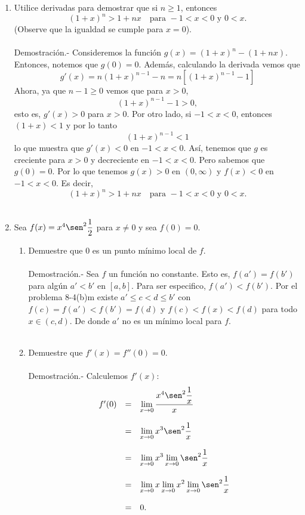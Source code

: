 \begin{enumerate}[\bfseries 1.]
    \item Utilice derivadas para demostrar que si $n\geq 1$, entonces 
    $$(1+x)^n>1+nx\quad \mbox{para }-1<x<0 \mbox{ y } 0<x.$$
    (Observe que la igualdad se cumple para $x=0$).\\\\
	Demostración.-\; Consideremos la función $g(x)=(1+x)^n-(1+nx)$. Entonces, notemos que $g(0)=0$. Además, calculando la derivada vemos que
	$$g'(x)=n(1+x)^{n-1}-n=n\left[(1+x)^{n-1}-1\right]$$
	Ahora, ya que $n-1\geq 0$ vemos que para $x>0$,
	$$(1+x)^{n-1}-1>0,$$
	esto es, $g'(x)>0$ para $x>0$. Por otro lado, si $-1<x<0$, entonces $(1+x)<1$ y por lo tanto
	$$(1+x)^{n-1}<1$$
	lo que muestra que $g'(x)<0$ en $-1<x<0$. Así,  tenemos que $g$ es creciente para $x>0$ y decreciente en $-1<x<0$. Pero sabemos que $g(0)=0$. Por lo que tenemos $g(x)>0$ en $(0,\infty)$ y $f(x)<0$ en $-1<x<0$. Es decir,
	$$(1+x)^n>1+nx\quad \mbox{para }-1<x<0 \mbox{ y } 0<x.$$\\

    \item Sea $f(x)=x^4\sen^2\dfrac{1}{2}$ para $x\neq 0$ y sea $f(0)=0$. 
	\begin{enumerate}

	    \item Demuestre que $0$ es un punto mínimo local de $f$.\\\\
		Demostración.-\; Sea $f$ un función no constante. Esto es, $f(a')=f(b')$ para algún $a'<b'$ en $[a,b]$. Para ser especifico, $f(a')<f(b')$. Por el problema 8-4(b)m existe $a'\leq c<d\leq b'$ con $f(c)=f(a')<f(b')=f(d)$ y $f(c)<f(x)<f(d)$ para todo $x\in(c,d)$. De donde  $a'$  no es un mínimo local para $f$.\\\\

	    \item Demuestre que $f'(x)=f''(0)=0.$\\\\
		Demostración.-\; Calculemos $f'(x)$:
		$$
		\begin{array}{rcl}
		    f'(0) &=& \displaystyle\lim_{x\to 0} \dfrac{x^4\sen^2\dfrac{1}{x}}{x}\\\\
			  &=& \displaystyle\lim_{x\to 0}x^3\sen^2\dfrac{1}{x}\\\\
			  &=& \displaystyle\lim_{x\to 0}x^3\lim_{x\to 0}\sen^2\dfrac{1}{x}\\\\
			  &=& \displaystyle\lim_{x\to 0} x \lim_{x\to 0}x^2\lim_{x\to 0}\sen^2\dfrac{1}{x}\\\\
			  &=& 0.
		\end{array}
		$$


\end{enumerate}
\end{enumerate}
